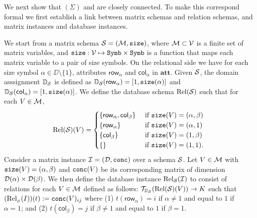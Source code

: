 \newcommand{\row}{\mathsf{row}}
\newcommand{\rows}{\mathsf{rows}}
\newcommand{\col}{\mathsf{col}}
\newcommand{\cols}{\mathsf{cols}}

We next show that \lang$(\Sigma)$ and \ARA are closely connected. To make this correspond formal we first establish a link between matrix schemas and relation schemas, and matrix instances and database instances.

We start from a matrix schema $\mathcal{S}=(\mathcal{M},\texttt{size})$, where $\mathcal{M}\subset \mathcal{V}$ is a finite set of matrix variables, and $\texttt{size}: \mathcal{V} \mapsto \texttt{Symb}\times \texttt{Symb}$ is a function that maps each matrix variable to a pair of size symbols. On the relational side
we have for each size symbol $\alpha\in\DD\setminus\{1\}$, attributes $\row_\alpha$ and $\col_\alpha$ in $\mathbf{att}$. Given
$\mathcal{S}$, the domain asssignment $\mathbb{D}_{\mathcal{S}}$ is defined as 
$\mathbb{D}_\Sch(\row_\alpha)=[1,\size(\alpha)]$ and 
$\mathbb{D}_\Sch(\col_\alpha)=[1,\size(\alpha)]$. We define the database  schema $\text{Rel}(\mathcal{S})$ such that for each $V\in\mathcal{M}$,
\[
	\text{Rel}(\Sch)(V) = \begin{cases}
		\lbrace\row_\alpha,\col_\beta \rbrace & \text{ if $ \size(V)=(\alpha,\beta)$} \\
		\lbrace\row_\alpha \rbrace & \text{ if $ \size(V)=(\alpha,1)$} \\
		\lbrace\col_\beta \rbrace  &
	 \text{ if $ \size(V)=(1,\beta)$} \\
		\lbrace\rbrace & \text{ if $\size(V)=(1,1)$}.
\end{cases}
\]
Consider a matrix instance $\mathcal{I} = (\mathcal{D},\texttt{conc})$ over a schema $\mathcal{S}$.
Let $V\in\mathcal{M}$ with $\texttt{size}(V)=(\alpha,\beta)$ and $\texttt{conc}(V)$ be its corresponding matrix of dimension $\mathcal{D}(\alpha)\times \mathcal{D}(\beta)$.
We then define the database instance $\text{Rel}_{\mathcal{S}}(\mathcal{I})$  to consist of relations for each $V\in\mathcal{M}$ defined as follows:
$\mathcal{T}_{\mathbb{D}_{\mathcal{S}}}(\text{Rel}(\mathcal{S})(V)) \to K$ such that
$(\text{Rel}_{_{\mathcal{S}}}(I))(t):=\texttt{conc}(V)_{ij}$ where (1) $t(\row_\alpha)=i$ if $\alpha\neq 1$ and equal to $1$ if $\alpha = 1$; and (2) $t(\col_\beta)=j$ if $\beta\neq 1$ and equal to $1$ if $\beta= 1$.
